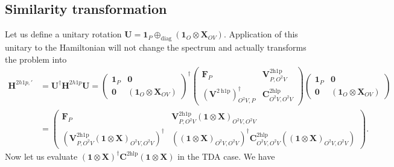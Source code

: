 \subsection{Similarity transformation}
\label{sec:gwtda_sim}
Let us define a unitary rotation $\bm{U} = \bm{1}_P \oplus_{\text{diag}} \left( \bm{1}_O \otimes \bm{X}_{OV} \right)$. Application of this unitary to the Hamiltonian will not change the spectrum and actually transforms the problem into
\begin{align}
    \bm{H}^{2h1p,\prime} &= \bm{U}^\dag \bm{H}^{2h1p} \bm{U} = \begin{pmatrix} \bm{1}_{P} & \bm{0}\\ \bm{0}&\left( \bm{1}_O \otimes \bm{X }_{OV} \right) \end{pmatrix}^\dag \begin{pmatrix} \bm{F}_P & \bm{V}^{2 \mathrm{h1p}}_{P,O^2V}\\ \left(\bm{V}^{2 \mathrm{~h} 1 \mathrm{p}}\right)^{\dagger}_{O^2V,P} & \bm{C}^{2 \mathrm{hlp}}_{O^2V,O^2V} \end{pmatrix} \begin{pmatrix} \bm{1}_P & \bm{0}\\ \bm{0}&\left( \bm{1}_O \otimes \bm{X }_{OV} \right) \end{pmatrix}\\
& = \begin{pmatrix} \bm{F}_P & \bm{V}^{2 \mathrm{h1p}}_{P,O^2V}\left( \bm{1}\otimes \bm{X }\right)_{O^2V,O^2V}\\ \left(\bm{V}^{2 \mathrm{h1p}}_{P,O^2V}\left( \bm{1} \otimes \bm{X } \right)_{O^2V,O^2V}\right)^{\dagger} & \left( \left( \bm{1} \otimes \bm{X } \right)_{O^2V,O^2V}\right)^\dagger \bm{C}^{2 \mathrm{hlp}}_{O^2V,O^2V} \left( \left( \bm{1} \otimes \bm{X } \right)_{O^2V,O^2V} \right) \end{pmatrix}.
\label{eq:booth_upfolded_hamiltonian}
\end{align}
Now let us evaluate $\left( \bm{1} \otimes \bm{X } \right)^\dagger \bm{C}^{2 \mathrm{hlp}} \left( \bm{1} \otimes \bm{X } \right)$ in the TDA case. We have
